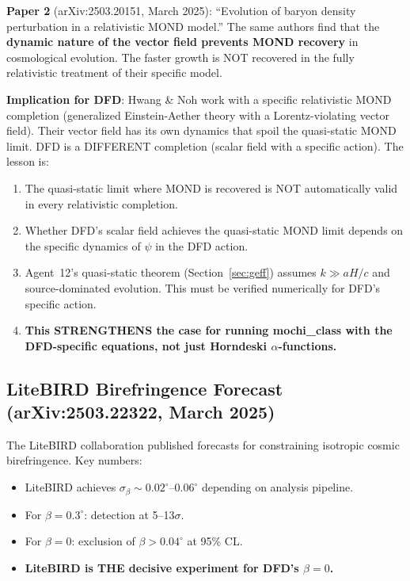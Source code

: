 \documentclass[11pt]{article}
\begin{document}
\textbf{Paper 2} (arXiv:2503.20151, March 2025): ``Evolution of baryon density
perturbation in a relativistic MOND model.'' The same authors find that the
\textbf{dynamic nature of the vector field prevents MOND recovery} in cosmological
evolution. The faster growth is NOT recovered in the fully relativistic treatment
of their specific model.

\textbf{Implication for DFD}: Hwang \& Noh work with a specific relativistic
MOND completion (generalized Einstein-Aether theory with a Lorentz-violating
vector field). Their vector field has its own dynamics that spoil the quasi-static
MOND limit. DFD is a DIFFERENT completion (scalar field with a specific action).
The lesson is:
\begin{enumerate}
\item The quasi-static limit where MOND is recovered is NOT automatically
  valid in every relativistic completion.
\item Whether DFD's scalar field achieves the quasi-static MOND limit
  depends on the specific dynamics of $\psi$ in the DFD action.
\item Agent~12's quasi-static theorem (Section~\ref{sec:geff}) assumes
  $k \gg aH/c$ and source-dominated evolution. This must be verified
  numerically for DFD's specific action.
\item \textbf{This STRENGTHENS the case for running mochi\_class with
  the DFD-specific equations, not just Horndeski $\alpha$-functions.}
\end{enumerate}

\subsection{LiteBIRD Birefringence Forecast (arXiv:2503.22322, March 2025)}

The LiteBIRD collaboration published forecasts for constraining isotropic
cosmic birefringence. Key numbers:
\begin{itemize}
\item LiteBIRD achieves $\sigma_\beta \sim 0.02^\circ$--$0.06^\circ$
  depending on analysis pipeline.
\item For $\beta = 0.3^\circ$: detection at 5--13$\sigma$.
\item For $\beta = 0$: exclusion of $\beta > 0.04^\circ$ at 95\% CL.
\item \textbf{LiteBIRD is THE decisive experiment for DFD's $\beta = 0$.}
\end{itemize}
\end{document}
